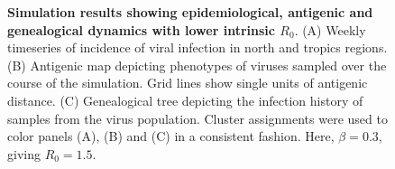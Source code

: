 \documentclass[11pt,oneside,letterpaper]{article}
\begin{document}
\vspace*{\fill}
\begin{figure}[H]
	\centering
	\caption{\textbf{Simulation results showing epidemiological, antigenic and genealogical dynamics with lower intrinsic $R_0$}. (A) Weekly timeseries of incidence of viral infection in north and tropics regions. (B) Antigenic map depicting phenotypes of viruses sampled over the course of the simulation.  Grid lines show single units of antigenic distance. (C) Genealogical tree depicting the infection history of samples from the virus population.  Cluster assignments were used to color panels (A), (B) and (C) in a consistent fashion.  Here, $\beta = 0.3$, giving $R_0 = 1.5$.}
	\label{h1n1_r0}
\end{figure}
\vspace*{\fill}

\pagebreak
\end{document}
